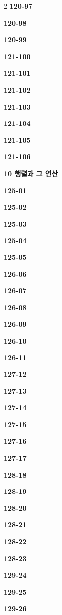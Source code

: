 \documentclass[10pt,a4paper]{article}
\begin{document}
\begin{multicols}{2}
\noindent\textbf{120-97}\ \par
\noindent\textbf{120-98}\ \par
\noindent\textbf{120-99}\ \par
\noindent\textbf{121-100}\ \par
\noindent\textbf{121-101}\ \par
\noindent\textbf{121-102}\ \par
\noindent\textbf{121-103}\ \par
\noindent\textbf{121-104}\ \par
\noindent\textbf{121-105}\ \par
\noindent\textbf{121-106}\ \par
\noindent\textbf{10 행렬과 그 연산}\par\smallskip
\noindent\textbf{125-01}\ \par
\noindent\textbf{125-02}\ \par
\noindent\textbf{125-03}\ \par
\noindent\textbf{125-04}\ \par
\noindent\textbf{125-05}\ \par
\noindent\textbf{126-06}\ \par
\noindent\textbf{126-07}\ \par
\noindent\textbf{126-08}\ \par
\noindent\textbf{126-09}\ \par
\noindent\textbf{126-10}\ \par
\noindent\textbf{126-11}\ \par
\noindent\textbf{127-12}\ \par
\noindent\textbf{127-13}\ \par
\noindent\textbf{127-14}\ \par
\noindent\textbf{127-15}\ \par
\noindent\textbf{127-16}\ \par
\noindent\textbf{127-17}\ \par
\noindent\textbf{128-18}\ \par
\noindent\textbf{128-19}\ \par
\noindent\textbf{128-20}\ \par
\noindent\textbf{128-21}\ \par
\noindent\textbf{128-22}\ \par
\noindent\textbf{128-23}\ \par
\noindent\textbf{129-24}\ \par
\noindent\textbf{129-25}\ \par
\noindent\textbf{129-26}\ \par

\end{multicols}
\end{document}
